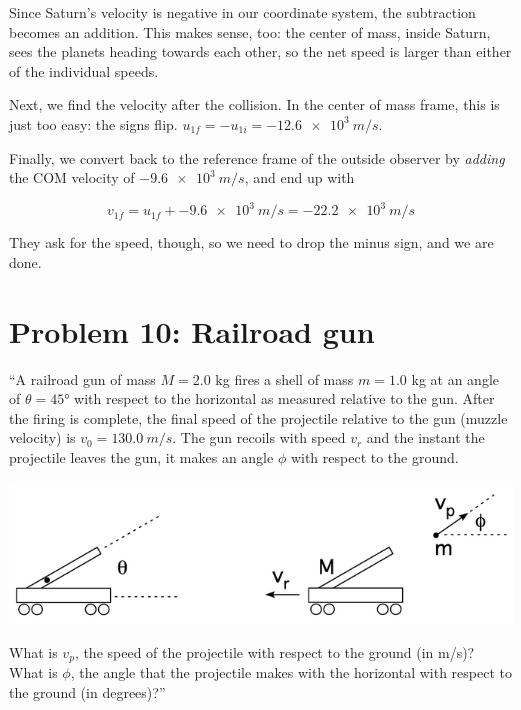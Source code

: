 \documentclass[8.01x]{subfiles}
\begin{document}
Since Saturn's velocity is negative in our coordinate system, the subtraction becomes an addition. This makes sense, too: the center of mass, inside Saturn, sees the planets heading towards each other, so the net speed is larger than either of the individual speeds.

Next, we find the velocity after the collision. In the center of mass frame, this is just too easy: the signs flip. $u_{1f} = -u_{1i} = \SI{-12.6e3}{m/s}$.

Finally, we convert back to the reference frame of the outside observer by \emph{adding} the COM velocity of $\SI{-9.6e3}{m/s}$, and end up with

\begin{equation}
v_{1f} = u_{1f} + \SI{-9.6e3}{m/s} = -\SI{22.2e3}{m/s}
\end{equation}

They ask for the speed, though, so we need to drop the minus sign, and we are done.

\section{Problem 10: Railroad gun}

``A railroad gun of mass $M = 2.0$ kg fires a shell of mass $m = 1.0$ kg at an angle of $\theta = \ang{45}$ with respect to the horizontal as measured relative to the gun. After the firing is complete, the final speed of the projectile relative to the gun (muzzle velocity) is $v_0 = \SI{130.0}{m/s}$. The gun recoils with speed $v_r$ and the instant the projectile leaves the gun, it makes an angle $\phi$ with respect to the ground.

\begin{center}
\includegraphics[scale=0.8]{Graphics/h6p10}
\end{center}

What is $v_p$, the speed of the projectile with respect to the ground (in m/s)?\\
What is $\phi$, the angle that the projectile makes with the horizontal with respect to the ground (in degrees)?''
\end{document}
